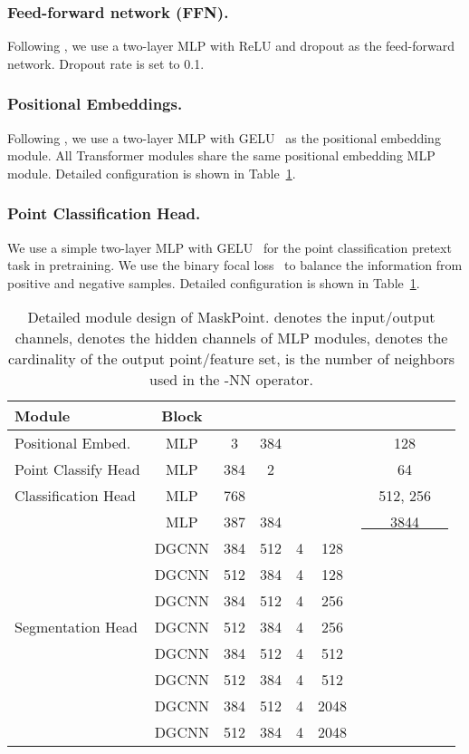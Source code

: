 \documentclass[runningheads]{llncs}
\begin{document}
\vspace{-10pt}
\subsubsection{Feed-forward network (FFN).} Following \cite{yu2021point}, we use a two-layer MLP with ReLU and dropout as the feed-forward network.  Dropout rate is set to 0.1.

\vspace{-10pt}
\subsubsection{Positional Embeddings.}
Following \cite{yu2021point}, we use a two-layer MLP with GELU~\cite{hendrycks2016gaussian} as the positional embedding module.  All Transformer modules share the same positional embedding MLP module.  Detailed configuration is shown in Table~\ref{tab:detail_design_config}.

\vspace{-10pt}
\subsubsection{Point Classification Head.}
We use a simple two-layer MLP with GELU~\cite{hendrycks2016gaussian} for the point classification pretext task in pretraining.  We use the binary focal loss~\cite{focalloss} to balance the information from positive and negative samples. Detailed configuration is shown in Table~\ref{tab:detail_design_config}.

\begin{table}[t]
    \tabcolsep=0.2cm
    \centering
\begin{tabular}{l|c|c|c|c|c|c}
\toprule
Module & Block &  &  &  &  &  \\
\midrule
Positional Embed. & MLP & 3 & 384 & & & 128 \\
\midrule
Point Classify Head & MLP & 384 & 2 & & & 64 \\
\midrule
Classification Head & MLP & 768 &  & & & 512, 256 \\
\midrule
\multirow{9}{*}{Segmentation Head} & MLP & 387 & 384 & & & \underline{~~~~3844~~~~}  \\
& DGCNN & 384 & 512 & 4 & 128 & \\
& DGCNN & 512 & 384 & 4 & 128 & \\
& DGCNN & 384 & 512 & 4 & 256 & \\
& DGCNN & 512 & 384 & 4 & 256 & \\
& DGCNN & 384 & 512 & 4 & 512 & \\
& DGCNN & 512 & 384 & 4 & 512 & \\
& DGCNN & 384 & 512 & 4 & 2048 & \\
& DGCNN & 512 & 384 & 4 & 2048 & \\
\bottomrule
\end{tabular}
    \caption{Detailed module design of MaskPoint.   denotes the input/output channels,  denotes the hidden channels of MLP modules,  denotes the cardinality of the output point/feature set,  is the number of neighbors used in the -NN operator.}
    \label{tab:detail_design_config}
    \vspace{-8pt}
\end{table}
\end{document}
